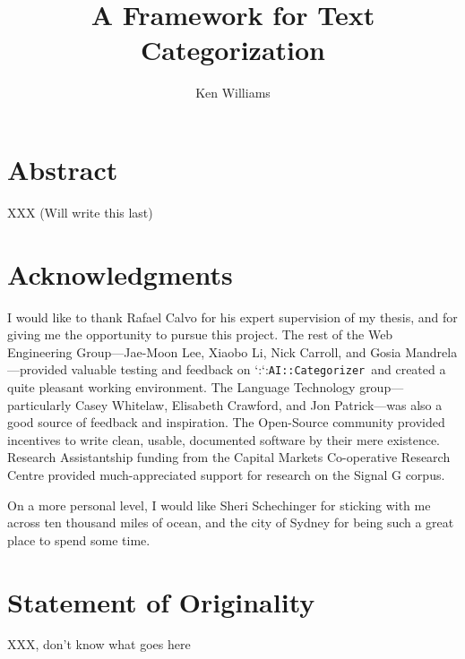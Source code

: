 \documentclass[a4paper]{report}
\title{A Framework for Text Categorization}
\author{Ken Williams}
\begin{document}
\newcommand{\method}[1]{\texttt{#1()}}
\newcommand{\param}[1]{\texttt{#1}}
\newcommand{\class}[1]{\lccode`:`:\texttt{#1}}
\newcommand{\aclass}[1]{\emph{\class{#1}}}
\newcommand{\aicat}{\class{AI::Cat\-e\-gor\-i\-zer}}
\newcommand{\naive}{Na\"\i ve}

\newcommand{\cats}{\mathcal{C}}
\newcommand{\docs}{\mathcal{D}}
\newcommand{\train}{\mathcal{T}^r}
\newcommand{\test}{\mathcal{T}^e}

\maketitle
\chapter*{Abstract}
XXX (Will write this last)
\chapter*{Acknowledgments}

I would like to thank Rafael Calvo for his expert supervision of my
thesis, and for giving me the opportunity to pursue this project.  The
rest of the Web Engineering Group---Jae-Moon Lee, Xiaobo Li, Nick
Carroll, and Gosia Mandrela---provided valuable testing and feedback
on \aicat\ and created a quite pleasant working environment.  The
Language Technology group---particularly Casey Whitelaw, Elisabeth
Crawford, and Jon Patrick---was also a good source of feedback and
inspiration.  The Open-Source community provided incentives to write
clean, usable, documented software by their mere existence.  Research
Assistantship funding from the Capital Markets Co-operative Research
Centre provided much-appreciated support for research on the Signal G
corpus.

On a more personal level, I would like Sheri Schechinger for sticking
with me across ten thousand miles of ocean, and the city of Sydney for
being such a great place to spend some time.


\chapter*{Statement of Originality}
XXX, don't know what goes here
\tableofcontents










\end{document}

